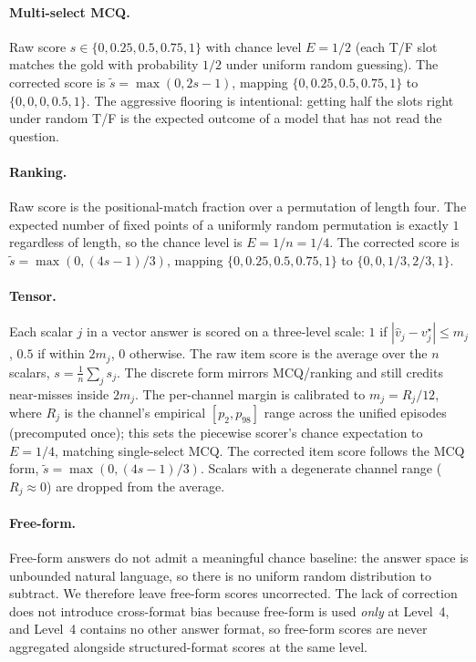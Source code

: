 \documentclass{article}
\begin{document}
\paragraph{Multi-select MCQ.} Raw score $s\in\{0,0.25,0.5,0.75,1\}$ with chance level $E=1/2$ (each T/F slot matches the gold with probability $1/2$ under uniform random guessing). The corrected score is $\tilde{s} = \max(0, 2s-1)$, mapping $\{0,0.25,0.5,0.75,1\}$ to $\{0,0,0,0.5,1\}$. The aggressive flooring is intentional: getting half the slots right under random T/F is the expected outcome of a model that has not read the question.

\paragraph{Ranking.} Raw score is the positional-match fraction over a permutation of length four. The expected number of fixed points of a uniformly random permutation is exactly $1$ regardless of length, so the chance level is $E=1/n=1/4$. The corrected score is $\tilde{s} = \max(0, (4s-1)/3)$, mapping $\{0,0.25,0.5,0.75,1\}$ to $\{0,0,1/3,2/3,1\}$.

\paragraph{Tensor.} Each scalar $j$ in a vector answer is scored on a three-level scale: $1$ if $|\hat{v}_j - v_j^{\star}| \leq m_j$, $0.5$ if within $2 m_j$, $0$ otherwise. The raw item score is the average over the $n$ scalars, $s = \tfrac{1}{n}\sum_j s_j$. The discrete form mirrors MCQ/ranking and still credits near-misses inside $2 m_j$. The per-channel margin is calibrated to $m_j = R_j / 12$, where $R_j$ is the channel's empirical $[p_2, p_{98}]$ range across the unified episodes (precomputed once); this sets the piecewise scorer's chance expectation to $E = 1/4$, matching single-select MCQ. The corrected item score follows the MCQ form, $\tilde{s} = \max(0, (4s - 1)/3)$. Scalars with a degenerate channel range ($R_j \approx 0$) are dropped from the average.

\paragraph{Free-form.} Free-form answers do not admit a meaningful chance baseline: the answer space is unbounded natural language, so there is no uniform random distribution to subtract. We therefore leave free-form scores uncorrected. The lack of correction does not introduce cross-format bias because free-form is used \emph{only} at Level~4, and Level~4 contains no other answer format, so free-form scores are never aggregated alongside structured-format scores at the same level.
\end{document}
